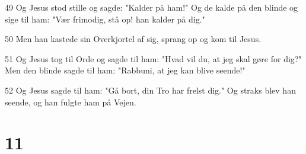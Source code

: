 \par 49 Og Jesus stod stille og sagde: "Kalder på ham!" Og de kalde på den blinde og sige til ham: "Vær frimodig, stå op! han kalder på dig."
\par 50 Men han kastede sin Overkjortel af sig, sprang op og kom til Jesus.
\par 51 Og Jesus tog til Orde og sagde til ham: "Hvad vil du, at jeg skal gøre for dig?" Men den blinde sagde til ham: "Rabbuni, at jeg kan blive seende!"
\par 52 Og Jesus sagde til ham: "Gå bort, din Tro har frelst dig." Og straks blev han seende, og han fulgte ham på Vejen.

\chapter{11}

